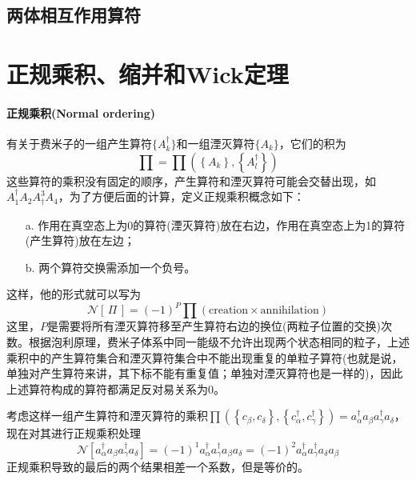 \subsection{两体相互作用算符}

\section{正规乘积、缩并和Wick定理}

\paragraph*{正规乘积(Normal ordering)}
有关于费米子的一组产生算符$\{A^{\dagger}_{k}\}$和一组湮灭算符$\{A_k\}$，它们的积为
\begin{equation}
    \prod = \prod \left(\left\{A_k\right\}, \left\{A^{\dagger}_l\right\}\right)
\end{equation}
这些算符的乘积没有固定的顺序，产生算符和湮灭算符可能会交替出现，如$A_1^\dagger A_2 A^3_\dagger A_4$，为了方便后面的计算，定义正规乘积概念如下：
\begin{enumerate}[topsep=1pt,itemsep=0pt]
	\item [a.] 作用在真空态上为0的算符(湮灭算符)放在右边，作用在真空态上为1的算符(产生算符)放在左边；
	\item [b.] 两个算符交换需添加一个负号。
\end{enumerate}
这样，他的形式就可以写为
\begin{equation}
    \mathcal{N}[\,\Pi \,] = (-1)^{P} \prod \left(\text{creation} \times \text{annihilation}\right)
\end{equation}
这里，$P$是需要将所有湮灭算符移至产生算符右边的换位(两粒子位置的交换)次数。根据泡利原理，费米子体系中同一能级不允许出现两个状态相同的粒子，上述乘积中的产生算符集合和湮灭算符集合中不能出现重复的单粒子算符(也就是说，单独对产生算符来讲，其下标不能有重复值；单独对湮灭算符也是一样的)，因此上述算符构成的算符都满足反对易关系为0。
\begin{example}
    考虑这样一组产生算符和湮灭算符的乘积$\prod(\left\{c_\beta, c_\delta\right\}, \left\{c_{\alpha}^{\dagger}, c_{\gamma}^{\dagger}\right\}) = a_{\alpha}^{\dagger} a_{\beta} a_{\gamma}^{\dagger} a_{\delta}$，现在对其进行正规乘积处理
    \begin{equation}
        \mathcal{N}\left[a_{\alpha}^{\dagger} a_{\beta} a_{\gamma}^{\dagger} a_{\delta}\right] = (-1)^{1} a_{\alpha}^{\dagger} a_{\gamma}^{\dagger} a_{\beta} a_{\delta} = (-1)^{2} a_{\alpha}^{\dagger} a_{\gamma}^{\dagger} a_{\delta} a_{\beta}
    \end{equation} 
    正规乘积导致的最后的两个结果相差一个系数，但是等价的。
\end{example}

